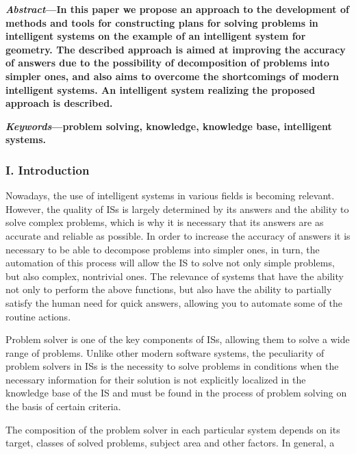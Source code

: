 \documentclass [11pt, a4paper]{article}
\begin{document}
\begin{multicols}{2} 
\par\quad\textbf{ \textit{Abstract}—In this paper we propose an approach to the
development of methods and tools for constructing plans for
solving problems in intelligent systems on the example of
an intelligent system for geometry. The described approach
is aimed at improving the accuracy of answers due to
the possibility of decomposition of problems into simpler
ones, and also aims to overcome the shortcomings of
modern intelligent systems. An intelligent system realizing
the proposed approach is described.}
\par\quad\textbf{\textit{Keywords}—problem solving, knowledge, knowledge base,
intelligent systems.}
\begin{center}
    

\subsubsection*{\textnormal{I. Introduction}}
\end{center}
\par \quad Nowadays, the use of intelligent systems in various
fields is becoming relevant. However, the quality of ISs
is largely determined by its answers and the ability to
solve complex problems, which is why it is necessary that
its answers are as accurate and reliable as possible. In
order to increase the accuracy of answers it is necessary
to be able to decompose problems into simpler ones, in
turn, the automation of this process will allow the IS to
solve not only simple problems, but also complex, nontrivial ones. The relevance of systems that have the ability not only to perform the above functions, but also have
the ability to partially satisfy the human need for quick
answers, allowing you to automate some of the routine
actions.\par \quad Problem solver is one of the key components of
ISs, allowing them to solve a wide range of problems.
Unlike other modern software systems, the peculiarity of
problem solvers in ISs is the necessity to solve problems
in conditions when the necessary information for their
solution is not explicitly localized in the knowledge base
of the IS and must be found in the process of problem
solving on the basis of certain criteria. \par \quad The composition of the problem solver in each particular system depends on its target, classes of solved
problems, subject area and other factors. In general, a

\end{multicols}
\end{document}
